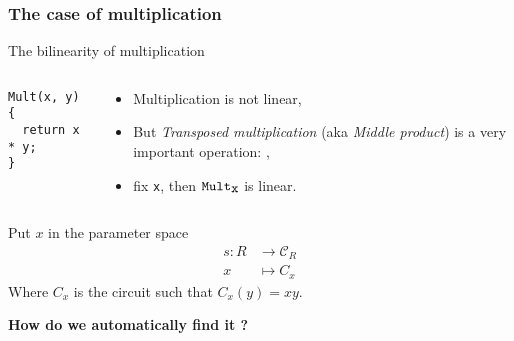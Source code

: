 \documentclass[10pt]{beamer}
\begin{document}

\begin{frame}[fragile]
  \frametitle{The case of multiplication}

  
  \begin{block}{The bilinearity of multiplication}
    \begin{columns}
      \begin{column}{0.3\textwidth}
        \begin{center}
          \begin{minipage}{0.7\textwidth}
            \footnotesize
\begin{verbatim}
Mult(x, y) {
  return x * y;
}
\end{verbatim}    
          \end{minipage}
        \end{center}
      \end{column}
      \begin{column}{0.7\textwidth}
        \begin{itemize}
        \item Multiplication \alert{is not linear},
        \item But \emph{Transposed multiplication} (aka \emph{Middle
          product}) is a very important operation: \cite{BLS03}, \cite{Sho95}
        \item fix \verb|x|, then $\verb|Mult|_{\verb|x|}$ \alert{is linear}.
        \end{itemize}
      \end{column}
    \end{columns}    
  \end{block}

  \begin{block}{Put $x$ in the parameter space}
    \begin{align*}
      s:R&\rightarrow\mathcal{C}_R\\
      x&\mapsto C_x
    \end{align*}
    Where $C_x$ is the circuit such that $C_x(y) = xy$.
  \end{block}

  \begin{center}
    \textbf{How do we automatically find it ?}
  \end{center}
\end{frame}

\end{document}
